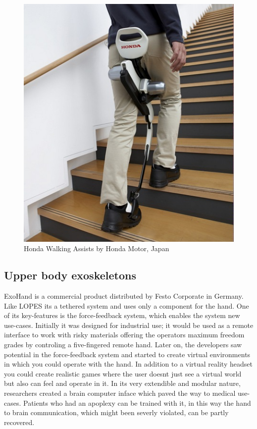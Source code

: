 \documentclass[letterpaper, 10 pt, conference]{ieeeconf}  %
\begin{document}
\begin{figure}[H]
  \centering
    \includegraphics[scale=0.5]{img/honda}
  \caption{Honda Walking Assists by Honda Motor, Japan}
\end{figure}
\newpage


\subsection{Upper body exoskeletons}

ExoHand is a commercial product distributed by Festo Corporate in Germany. Like LOPES its a tethered system and uses only a component for the hand. One of its key-features is the force-feedback system, which enables the system new use-cases. Initially it was designed for industrial use; it would be used as a remote interface to work with risky materials offering the operators maximum freedom grades by controling a five-fingered remote hand. Later on, the developers saw potential in the force-feedback system and started to create virtual environments in which you could operate with the hand. In addition to a virtual reality headset you could create realistic games where the user doesnt just see a virtual world but also can feel and operate in it. In its very extendible and modular nature, researchers created a brain computer inface which paved the way to medical use-cases. Patients who had an apoplexy can be trained with it, in this way the hand to brain communication, which might been severly violated, can be partly recovered.
\end{document}
